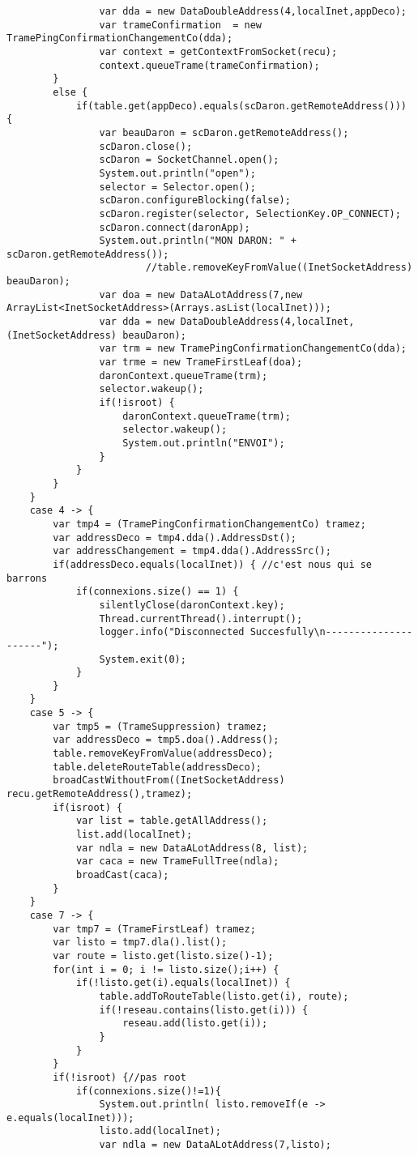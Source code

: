 \documentclass[a4paper,titlepage]{report}
\begin{document}
\begin{lstlisting}
				var dda = new DataDoubleAddress(4,localInet,appDeco);
				var trameConfirmation  = new TramePingConfirmationChangementCo(dda);
				var context = getContextFromSocket(recu);
				context.queueTrame(trameConfirmation);
		}
		else {
			if(table.get(appDeco).equals(scDaron.getRemoteAddress())) {					
				var beauDaron = scDaron.getRemoteAddress();
				scDaron.close();
				scDaron = SocketChannel.open();
				System.out.println("open");
				selector = Selector.open();
				scDaron.configureBlocking(false);
				scDaron.register(selector, SelectionKey.OP_CONNECT);					
				scDaron.connect(daronApp);
				System.out.println("MON DARON: " + scDaron.getRemoteAddress());
						//table.removeKeyFromValue((InetSocketAddress) beauDaron);
				var doa = new DataALotAddress(7,new ArrayList<InetSocketAddress>(Arrays.asList(localInet)));
				var dda = new DataDoubleAddress(4,localInet,(InetSocketAddress) beauDaron);
				var trm = new TramePingConfirmationChangementCo(dda);
				var trme = new TrameFirstLeaf(doa);
				daronContext.queueTrame(trm);
				selector.wakeup();					
				if(!isroot) {
					daronContext.queueTrame(trm);
					selector.wakeup();
					System.out.println("ENVOI");
				}
			}
		}
	}
	case 4 -> {
		var tmp4 = (TramePingConfirmationChangementCo) tramez;
		var addressDeco = tmp4.dda().AddressDst();
		var addressChangement = tmp4.dda().AddressSrc();
		if(addressDeco.equals(localInet)) { //c'est nous qui se barrons
			if(connexions.size() == 1) {
				silentlyClose(daronContext.key);
				Thread.currentThread().interrupt();
				logger.info("Disconnected Succesfully\n---------------------");
				System.exit(0);
			}
		}
	}
	case 5 -> {
		var tmp5 = (TrameSuppression) tramez;
		var addressDeco = tmp5.doa().Address();
		table.removeKeyFromValue(addressDeco);
		table.deleteRouteTable(addressDeco);
		broadCastWithoutFrom((InetSocketAddress) recu.getRemoteAddress(),tramez);
		if(isroot) {
			var list = table.getAllAddress();
			list.add(localInet);
			var ndla = new DataALotAddress(8, list);
			var caca = new TrameFullTree(ndla);
			broadCast(caca);
		}
	}
	case 7 -> {
		var tmp7 = (TrameFirstLeaf) tramez;
		var listo = tmp7.dla().list();
		var route = listo.get(listo.size()-1);
		for(int i = 0; i != listo.size();i++) {
			if(!listo.get(i).equals(localInet)) {
				table.addToRouteTable(listo.get(i), route);
				if(!reseau.contains(listo.get(i))) {
					reseau.add(listo.get(i));
				}
			}	
		}
		if(!isroot) {//pas root
			if(connexions.size()!=1){
				System.out.println( listo.removeIf(e -> e.equals(localInet)));
				listo.add(localInet);
				var ndla = new DataALotAddress(7,listo);

\end{lstlisting}
\end{document}
